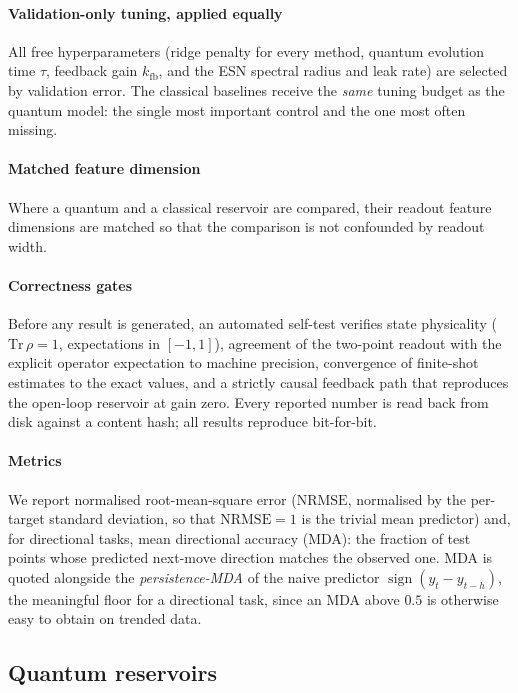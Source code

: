 ﻿\documentclass[10pt,conference]{IEEEtran}
\newcommand{\nrmse}{\mathrm{NRMSE}}
\begin{document}
\paragraph{Validation-only tuning, applied equally} All free hyperparameters
(ridge penalty for every method, quantum evolution time $\tau$, feedback gain
$k_{\mathrm{fb}}$, and the ESN spectral radius and leak rate) are selected by
validation error. The classical baselines receive the \emph{same} tuning budget
as the quantum model: the single most important control and the one most often
missing.

\paragraph{Matched feature dimension} Where a quantum and a classical reservoir
are compared, their readout feature dimensions are matched so that the comparison
is not confounded by readout width.

\paragraph{Correctness gates} Before any result is generated, an automated
self-test verifies state physicality ($\mathrm{Tr}\,\rho=1$, expectations in
$[-1,1]$), agreement of the two-point readout with the explicit operator
expectation to machine precision, convergence of finite-shot estimates to the
exact values, and a strictly causal feedback path that reproduces the open-loop
reservoir at gain zero. Every reported number is read back from disk against a
content hash; all results reproduce bit-for-bit.

\paragraph{Metrics} We report normalised root-mean-square error ($\nrmse$,
normalised by the per-target standard deviation, so that $\nrmse=1$ is the
trivial mean predictor) and, for directional tasks, mean directional accuracy
(MDA): the fraction of test points whose predicted next-move direction matches
the observed one. MDA is quoted alongside the \emph{persistence-MDA} of the
naive predictor $\operatorname{sign}(y_t-y_{t-h})$, the meaningful floor for a
directional task, since an MDA above $0.5$ is otherwise easy to obtain on
trended data.

\subsection{Quantum reservoirs}
\end{document}
